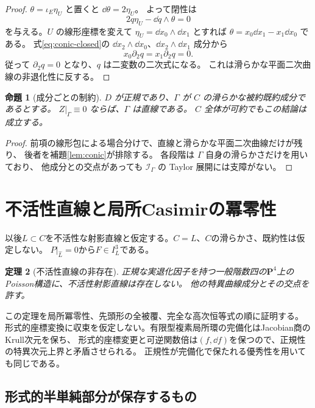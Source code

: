 \documentclass[11pt,a4paper]{ltjsarticle}
\newcommand{\PP}{\mathbf P}\renewcommand{\AA}{\mathbf A}
\newtheorem{theorem}{定理}[section]
\newtheorem{proposition}[theorem]{命題}
\theoremstyle{remark}\newtheorem{remark}[theorem]{注意}
\begin{document}
\begin{proof}
$\theta=\iota_E\eta_U$ と置くと $\dd\theta=2\eta_U$。
よって閉性は
\begin{equation}\label{eq:conic-closed}
                        2q\eta_U-\dd q\wedge\theta=0
\end{equation}
を与える。$U$ の線形座標を変えて $\eta_U=\dd x_0\wedge\dd x_1$ とすれば
$\theta=x_0\dd x_1-x_1\dd x_0$ である。
式\eqref{eq:conic-closed}の $\dd x_2\wedge\dd x_0$、$\dd x_2\wedge\dd x_1$ 成分から
\[
                         x_0\partial_2q=x_1\partial_2q=0.
\]
従って $\partial_2q=0$ となり、$q$ は二変数の二次式になる。
これは滑らかな平面二次曲線の非退化性に反する。
\end{proof}

\begin{proposition}[成分ごとの制約]\label{prop:inactive-line}
$D$ が正規であり、$\Gamma$ が $C$ の滑らかな被約既約成分であるとする。
$Z|_\Gamma\equiv0$ ならば、$\Gamma$ は直線である。
$C$ 全体が可約でもこの結論は成立する。
\end{proposition}
\begin{proof}
前項の線形包による場合分けで、直線と滑らかな平面二次曲線だけが残り、
後者を補題\ref{lem:conic}が排除する。
各段階は $\Gamma$ 自身の滑らかさだけを用いており、
他成分との交点があっても $\mathcal I_\Gamma$ の Taylor 展開には支障がない。
\end{proof}



\section{不活性直線と局所Casimirの冪零性}\label{sec:inactive-local}
以後$L\subset C$を不活性な射影直線と仮定する。$C=L$、$C$の滑らかさ、既約性は仮定しない。
$P|_{\widehat L}=0$から$F\in I_L^3$である。
\begin{theorem}[不活性直線の非存在]\label{thm:v19-main}
正規な実退化因子を持つ一般階数四の$\PP^4$上のPoisson構造に、不活性射影直線は存在しない。
他の特異曲線成分とその交点を許す。
\end{theorem}
この定理を局所冪零性、先頭形の全被覆、完全な高次恒等式の順に証明する。
形式的座標変換に収束を仮定しない。有限型複素局所環の完備化はJacobian商のKrull次元を保ち、
形式的座標変更と可逆関数倍は$(f,\dd f)$を保つので、正規性の特異次元上界と矛盾させられる。
正規性が完備化で保たれる優秀性を用いても同じである\cite{Stacks}。


\subsection{形式的半単純部分が保存するもの}
\end{document}
